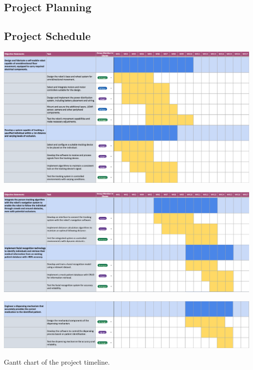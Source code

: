 \documentclass{article}
\begin{document}
\begin{landscape}
\section{Project Planning}

\subsection{Project Schedule}

\begin{table}[H]
    \centering
    \includegraphics[width=1.2\textwidth]{media/gantt-1.png}
\end{table}
\begin{table}[H]
    \centering
    \includegraphics[width=1.2\textwidth]{media/gantt-2.png}
    
    \label{table:gantt_chart}
\end{table}
\begin{table}[H]
    \centering
    \includegraphics[width=1.2\textwidth]{media/gantt-3.png}
    \caption{Gantt chart of the project timeline.}
    \label{table:gantt_chart}
\end{table}
\end{landscape}
\end{document}
